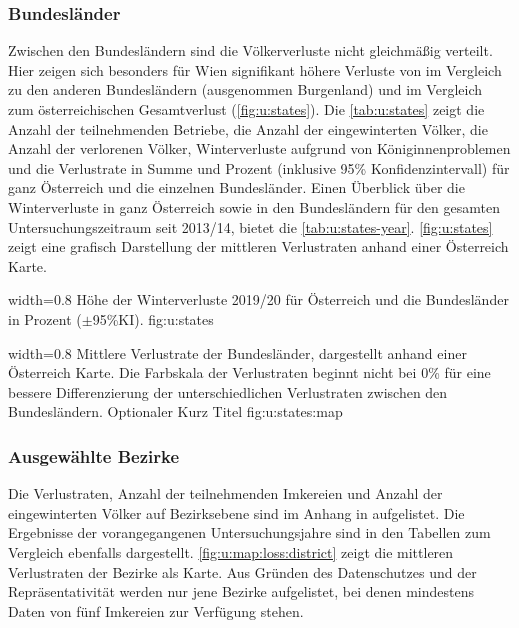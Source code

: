 \subsubsection{Bundesländer}

Zwischen den Bundesländern sind die Völkerverluste nicht gleichmäßig verteilt. Hier zeigen sich besonders für Wien signifikant höhere Verluste von  im Vergleich zu den anderen Bundesländern (ausgenommen Burgenland) und im Vergleich zum österreichischen Gesamtverlust (\cref{fig:u:states}). Die \cref{tab:u:states} zeigt die Anzahl der teilnehmenden Betriebe, die Anzahl der eingewinterten Völker, die Anzahl der verlorenen Völker, Winterverluste aufgrund von Königinnenproblemen und die Verlustrate in Summe und Prozent (inklusive 95\% Konfidenzintervall) für ganz Österreich und die einzelnen Bundesländer. Einen Überblick über die Winterverluste in ganz Österreich sowie in den Bundesländern für den gesamten Untersuchungszeitraum seit 2013/14, bietet die \cref{tab:u:states-year}. \cref{fig:u:states} zeigt eine grafisch Darstellung der mittleren Verlustraten anhand einer Österreich Karte.

  {width=0.8\textwidth} %
  {Höhe der Winterverluste 2019/20 für Österreich und die Bundesländer in Prozent ($\pm$95\%KI).} %
  {} %
  {fig:u:states} %




  {width=0.8\textwidth} %
  {Mittlere Verlustrate der Bundesländer, dargestellt anhand einer Österreich Karte. Die Farbskala der Verlustraten beginnt nicht bei 0\% für eine bessere Differenzierung der unterschiedlichen Verlustraten zwischen den Bundesländern.} %
  {Optionaler Kurz Titel} %
  {fig:u:states:map} %


\subsubsection{Ausgewählte Bezirke}

Die Verlustraten, Anzahl der teilnehmenden Imkereien und Anzahl der eingewinterten Völker auf Bezirksebene sind im Anhang in  aufgelistet. Die Ergebnisse der vorangegangenen Untersuchungsjahre sind in den Tabellen zum Vergleich ebenfalls dargestellt. \cref{fig:u:map:loss:district} zeigt die mittleren Verlustraten der Bezirke als Karte. Aus Gründen des Datenschutzes und der Repräsentativität werden nur jene Bezirke aufgelistet, bei denen mindestens Daten von fünf Imkereien zur Verfügung stehen.

